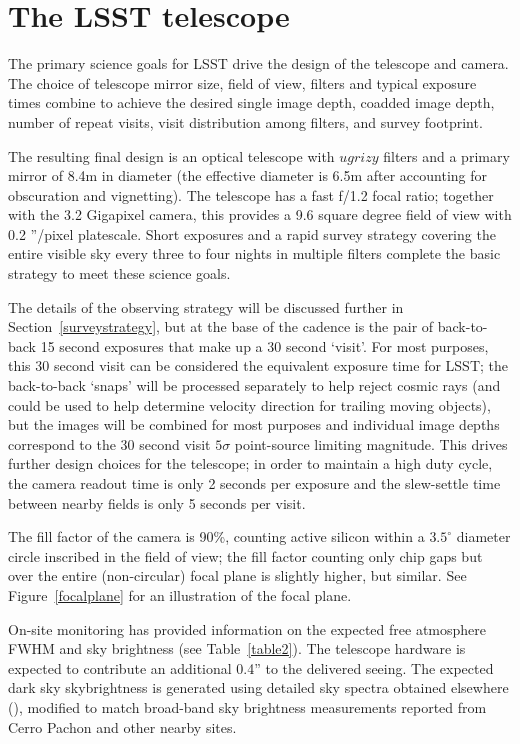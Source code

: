 \documentclass{iau}
\begin{document}
\section{The LSST telescope}

The primary science goals for LSST drive the design of the telescope
and camera. The choice of telescope mirror size, field of view,
filters and typical exposure times combine to achieve the desired
single image depth, coadded image depth, number of repeat visits, 
visit distribution among filters, and survey footprint.

The resulting final design is an optical telescope with
$ugrizy$ filters and a primary mirror of 8.4m in
diameter (the effective diameter is 6.5m after accounting for obscuration
and vignetting). The telescope has a fast f/1.2 focal ratio; together
with the 3.2 Gigapixel camera, this provides a 9.6 square degree field
of view with 0.2 ''/pixel platescale. Short exposures and a rapid
survey strategy covering the entire visible sky every three to four
nights in multiple filters complete the basic strategy to meet these
science goals.

The details of the observing strategy will be discussed further in
Section~\ref{surveystrategy}, but at the base of the cadence is the
pair of back-to-back 15 second exposures that make up a 30 second
`visit'. For most purposes, this 30 second visit can be considered the
equivalent exposure time for LSST; the back-to-back `snaps' will be
processed separately to help reject cosmic rays (and could be used to
help determine velocity direction for trailing moving objects), but
the images will be combined for most purposes and individual image
depths correspond to the 30 second visit $5\sigma$ point-source
limiting magnitude. This drives further design choices for the
telescope; in order to maintain a high duty cycle, the camera readout time
is only 2 seconds per exposure and the slew-settle time between
nearby fields is only 5 seconds per visit.

The fill factor of the camera is 90\%, counting active silicon within
a $3.5^\circ$ diameter circle inscribed in the field of view; the fill
factor counting only chip gaps but over the entire (non-circular)
focal plane is slightly higher, but similar. See
Figure~\ref{focalplane} for an illustration of the focal plane.

On-site monitoring has provided information on the expected free
atmosphere FWHM and sky brightness (see Table~\ref{table2}). The
telescope hardware is expected to contribute an additional 0.4'' to
the delivered seeing. The expected dark sky skybrightness is generated using
detailed sky spectra obtained elsewhere (\cite{patat}), modified to
match broad-band sky brightness measurements reported from Cerro
Pachon and other nearby sites.
\end{document}
